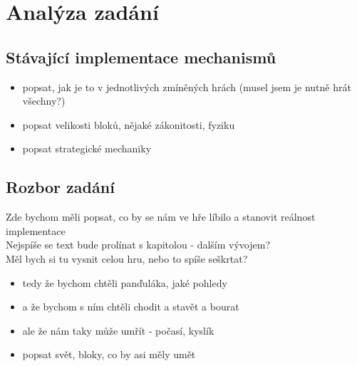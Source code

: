 
\chapter{Analýza zadání}

\section{Stávající implementace mechanismů}

\begin{itemize}
	\item popsat, jak je to v jednotlivých zmíněných hrách (musel jsem je nutně hrát všechny?)
	\item popsat velikosti bloků, nějaké zákonitosti, fyziku
	\item popsat strategické mechaniky
\end{itemize}

\section{Rozbor zadání}

Zde bychom měli popsat, co by se nám ve hře líbilo a stanovit reálnost implementace
\\

Nejspíše se text bude prolínat s kapitolou - dalším vývojem?\\
Měl bych si tu vysnit celou hru, nebo to spíše seškrtat?


\begin{itemize}
	\item tedy že bychom chtěli panďuláka, jaké pohledy
	\item a že bychom s ním chtěli chodit a stavět a bourat
	\item ale že nám taky může umřít - počasí, kyslík
	\item popsat svět, bloky, co by asi měly umět

\end{itemize}